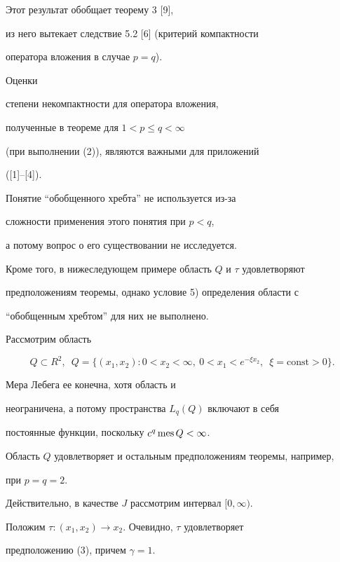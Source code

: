 \begin{notenonum}


Этот результат обобщает теорему 3 [9],


из него вытекает следствие 5.2 [6] (критерий компактности


оператора вложения в случае $p=q$).


Оценки


степени некомпактности для оператора вложения,


полученные в теореме для $1<p\le q<\infty$


(при выполнении (2)), являются важными для приложений


([1]--[4]).


\end{notenonum}





Понятие ``обобщенного хребта'' не используется из-за


сложности применения этого понятия при $p<q$,


а потому вопрос о его существовании не исследуется.


Кроме того, в нижеследующем примере область $Q$ и $\tau$ удовлетворяют


предположениям теоремы, однако условие 5) определения области с


``обобщенным хребтом'' для них не выполнено.





\begin{examnonum}


Рассмотрим область


$$


Q\subset R^2,\ \; Q=\{(x_1,x_2): 0<x_2<\infty,\


0<x_1<e^{-\xi x_2},\ \; \xi =\text{const}>0\}.


$$


Мера Лебега ее конечна, хотя область и


неограничена, а потому пространства $L_q(Q)$ включают в себя


постоянные функции, поскольку $c^q\operatorname{mes} Q<\infty$.


Область $Q$ удовлетворяет и остальным предположениям теоремы, например,


при $p=q=2$.


Действительно, в качестве $J$ рассмотрим интервал $[0,\infty)$.


Положим $\tau :(x_1,x_2)\to x_2$. Очевидно, $\tau$ удовлетворяет


предположению (3), причем $\gamma=1$.


\end{examnonum}





